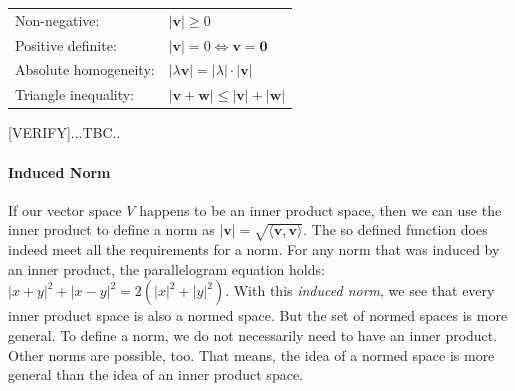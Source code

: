 \medskip
\begin{tabular}{l l}
Non-negative:         & $|\mathbf{v}| \geq 0$  \\
Positive definite:    & $|\mathbf{v}| = 0 \Leftrightarrow \mathbf{v} = \mathbf{0}$  \\
Absolute homogeneity: & $|\lambda \mathbf{v}| = |\lambda| \cdot |\mathbf{v}|$  \\
Triangle inequality:  & $|\mathbf{v} + \mathbf{w}| \leq |\mathbf{v}| + |\mathbf{w}|$
\end{tabular}
\medskip

[VERIFY]...TBC..


\paragraph{Induced Norm}
If our vector space $V$ happens to be an inner product space, then we can use the inner product to define a norm as $|\mathbf{v}| = \sqrt{\langle \mathbf{v,v}  \rangle}$. The so defined function does indeed meet all the requirements for a norm. For any norm that was induced by an inner product, the parallelogram equation holds: $|x+y|^2 + |x-y|^2 = 2(|x|^2 + |y|^2)$. With this \emph{induced norm}, we see that every inner product space is also a normed space. But the set of normed spaces is more general. To define a norm, we do not necessarily need to have an inner product. Other norms are possible, too. That means, the idea of a normed space is more general than the idea of an inner product space.





